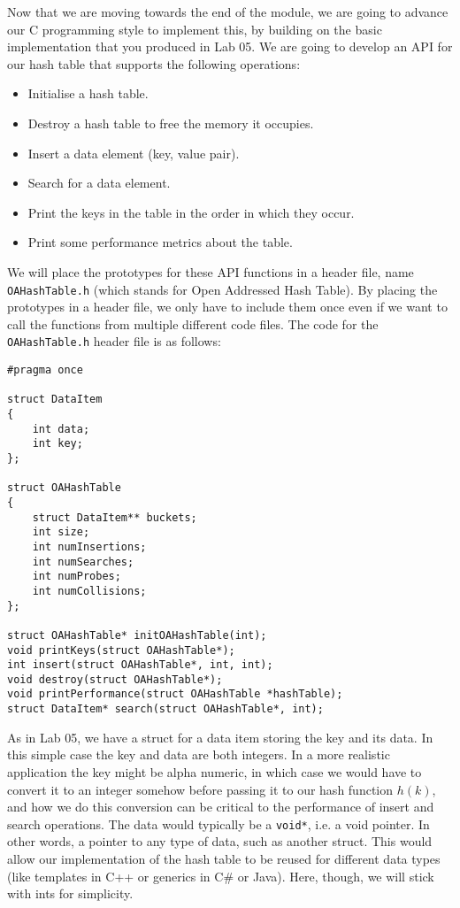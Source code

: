 \documentclass[10pt, a4paper, twosize]{article}
\begin{document}
Now that we are moving towards the end of the module, we are going to advance our C programming style to implement this, by building on the basic implementation that you produced in Lab 05. We are going to develop an API for our hash table that supports the following operations:

\begin{itemize}
\item Initialise a hash table.
\item Destroy a hash table to free the memory it occupies.
\item Insert a data element (key, value pair).
\item Search for a data element.
\item Print the keys in the table in the order in which they occur.
\item Print some performance metrics about the table.
\end{itemize}

We will place the prototypes for these API functions in a header file, name \texttt{OAHashTable.h} (which stands for Open Addressed Hash Table). By placing the prototypes in a header file, we only have to include them once even if we want to call the functions from multiple different code files. The code for the \texttt{OAHashTable.h} header file is as follows:

\begin{lstlisting}
#pragma once

struct DataItem 
{
    int data;
    int key;
};

struct OAHashTable
{
    struct DataItem** buckets;
    int size;
    int numInsertions;
    int numSearches;
    int numProbes;
    int numCollisions;
};

struct OAHashTable* initOAHashTable(int);
void printKeys(struct OAHashTable*);
int insert(struct OAHashTable*, int, int);
void destroy(struct OAHashTable*);
void printPerformance(struct OAHashTable *hashTable);
struct DataItem* search(struct OAHashTable*, int);
\end{lstlisting}

As in Lab 05, we have a struct for a data item storing the key and its data. In this simple case the key and data are both integers. In a more realistic application the key might be alpha numeric, in which case we would have to convert it to an integer somehow before passing it to our hash function $h(k)$, and how we do this conversion can be critical to the performance of insert and search operations. The data would typically be a \texttt{void*}, i.e. a void pointer. In other words, a pointer to any type of data, such as another struct. This would allow our implementation of the hash table to be reused for different data types (like templates in C++ or generics in C\# or Java). Here, though, we will stick with ints for simplicity.
\end{document}
